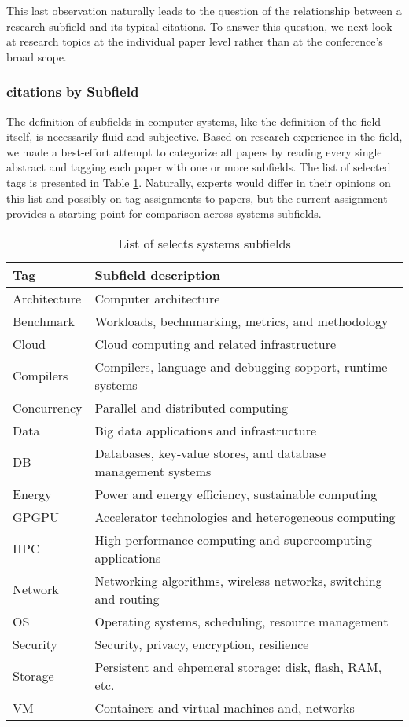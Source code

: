 \documentclass{article}
\begin{document}
This last observation naturally leads to the question of the relationship between a research subfield and its typical citations.
To answer this question, we next look at research topics at the individual paper level rather than at the conference's broad scope.

\hypertarget{citations-by-subfield}{%
\subsubsection{citations by Subfield}\label{citations-by-subfield}}

The definition of subfields in computer systems, like the definition of the field itself, is necessarily fluid and subjective.
Based on research experience in the field, we made a best-effort attempt to categorize all papers by reading every single abstract and tagging each paper with one or more subfields.
The list of selected tags is presented in Table \ref{tab:topic-tags}.
Naturally, experts would differ in their opinions on this list and possibly on tag assignments to papers, but the current assignment provides a starting point for comparison across systems subfields.

\begin{table}

\caption{\label{tab:topic-tags}List of selects systems subfields}
\centering
\begin{tabular}[t]{ll}
\toprule
Tag & Subfield description\\
\midrule
Architecture & Computer architecture\\
Benchmark & Workloads, bechnmarking, metrics, and methodology\\
Cloud & Cloud computing and related infrastructure\\
Compilers & Compilers, language and debugging sopport, runtime systems\\
Concurrency & Parallel and distributed computing\\
Data & Big data applications and infrastructure\\
DB & Databases, key-value stores, and database management systems\\
Energy & Power and energy efficiency, sustainable computing\\
GPGPU & Accelerator technologies and heterogeneous computing\\
HPC & High performance computing and supercomputing applications\\
Network & Networking algorithms, wireless networks, switching and routing\\
OS & Operating systems, scheduling, resource management\\
Security & Security, privacy, encryption, resilience\\
Storage & Persistent and ehpemeral storage: disk, flash, RAM, etc.\\
VM & Containers and virtual machines and, networks\\
\bottomrule
\end{tabular}
\end{table}
\end{document}
